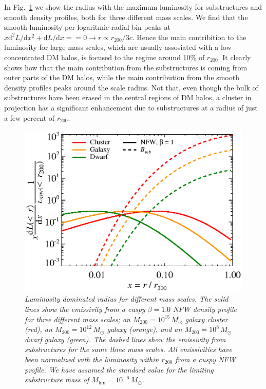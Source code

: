 \documentclass[10pt,aps,pra,reprint,amsmath,amsfonts,amssymb,showpacs]{revtex4-1}
\newcommand{\rmn}{\mathrm}
\newcommand{\msun}{M_\odot}
\newcommand{\dd}{\rmn{d}}
\newcommand{\rvir}{r_{200}}
\newcommand{\mvir}{M_{200}}
\begin{document}
In Fig.~\ref{fig:radial_emis} we show the radius with the maximum
luminosity for substructures and smooth density profiles, both for
three different mass scales. We find that the smooth luminosity per
logaritmic radial bin peaks at $x \dd^2 L/\dd x^2+\dd L/\dd x == 0
\rightarrow r \propto \rvir/3c$. Hence the main contribition to the
luminosity for large mass scales, which are usually assosiated with a
low concentrated DM halos, is focused to the regime around 10\% of
$\rvir$.  It clearly shows how that the main contribution from the
substructures is coming from outer parts of the DM halos, while the
main contribution from the smooth density profiles peaks around the
scale radius. Not that, even though the bulk of substructures have
been erased in the central regions of DM halos, a cluster in
projection has a significant enhancement due to substructures at a
radius of just a few percent of $\rvir$.
\begin{figure}
  \includegraphics[width=0.99\columnwidth]{figures/emissiv.sub.eps}
  \caption{\it Luminosity dominated radius for different mass
    scales. The solid lines show the emissivity from a cuspy
    $\beta=1.0$ NFW density profile for three different mass scales;
    an $\mvir=10^{15}\,\msun$ galaxy cluster (red), an
    $\mvir=10^{12}\,\msun$ galaxy (orange), and an
    $\mvir=10^{8}\,\msun$ dwarf galaxy (green). The dashed lines show
    the emissivity from substructures for the same three mass
    scales. All emissivities have been normalized with the luminosity
    within $\rvir$ from a cuspy NFW profile. We have assumed the
    standard value for the limiting substructure mass of
    $M_\rmn{lim}=10^{-6}\,\msun$.}
  \label{fig:radial_emis}
\end{figure}
\end{document}
